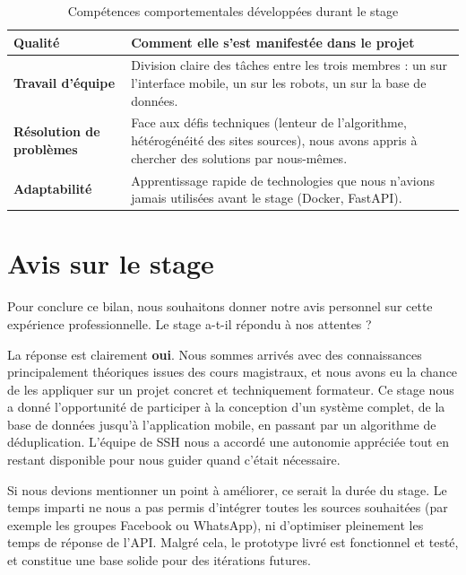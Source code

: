 \begin{table}[H]
    \centering
    \small
    \renewcommand{\arraystretch}{1.3}
    \begin{tabularx}{\textwidth}{|l|X|}
        \hline
        \rowcolor{headergray}
        \textbf{Qualit\'e} & \textbf{Comment elle s'est manifest\'ee dans le projet} \\ \hline
        \textbf{Travail d'\'equipe} & Division claire des t\^aches entre les trois membres : un sur l'interface mobile, un sur les robots, un sur la base de donn\'ees. \\ \hline
        \textbf{R\'esolution de probl\`emes} & Face aux d\'efis techniques (lenteur de l'algorithme, h\'et\'erog\'en\'eit\'e des sites sources), nous avons appris \`a chercher des solutions par nous-m\^emes. \\ \hline
        \textbf{Adaptabilit\'e} & Apprentissage rapide de technologies que nous n'avions jamais utilis\'ees avant le stage (Docker, FastAPI). \\ \hline
    \end{tabularx}
    \caption{Comp\'etences comportementales d\'evelopp\'ees durant le stage}
    \label{tab:soft_skills}
\end{table}

\section{Avis sur le stage}
Pour conclure ce bilan, nous souhaitons donner notre avis personnel sur cette exp\'erience professionnelle. Le stage a-t-il r\'epondu \`a nos attentes ?

La r\'eponse est clairement \textbf{oui}. Nous sommes arriv\'es avec des connaissances principalement th\'eoriques issues des cours magistraux, et nous avons eu la chance de les appliquer sur un projet concret et techniquement formateur. Ce stage nous a donn\'e l'opportunit\'e de participer \`a la conception d'un syst\`eme complet, de la base de donn\'ees jusqu'\`a l'application mobile, en passant par un algorithme de d\'eduplication. L'\'equipe de SSH nous a accord\'e une autonomie appr\'eci\'ee tout en restant disponible pour nous guider quand c'\'etait n\'ecessaire.

Si nous devions mentionner un point \`a am\'eliorer, ce serait la dur\'ee du stage. Le temps imparti ne nous a pas permis d'int\'egrer toutes les sources souhait\'ees (par exemple les groupes Facebook ou WhatsApp), ni d'optimiser pleinement les temps de r\'eponse de l'API. Malgr\'e cela, le prototype livr\'e est fonctionnel et test\'e, et constitue une base solide pour des it\'erations futures.

